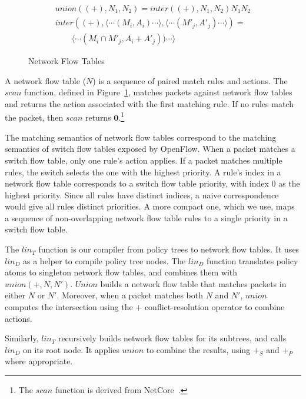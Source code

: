 \begin{figure}[t]
\begin{displaymath}
\begin{array}{l}
\mathit{union}((+),N_1,N_2) = \mathit{inter}((+),N_1,N_2) N_1 N_2 \\
\mathit{inter}((+),\langle\cdots(M_i,A_i)\cdots\rangle, \langle\cdots(M'_j,A'_j)\cdots\rangle) = \\
\qquad \langle\cdots(M_i \cap M'_j,A_i+A'_j))\cdots\rangle
\end{array}
\end{displaymath}

\caption{Network Flow Tables}
\label{f:intermediate}

\end{figure}

A network flow table ($N$) is a sequence of paired match rules
and actions. The $\mathit{scan}$ function, defined in
Figure~\ref{f:intermediate}, matches packets against network flow
tables and returns the action associated with the first matching rule. If
no rules match the packet, then $\mathit{scan}$ returns $\textbf{0}$.\footnote{The
  $\mathit{scan}$ function is derived from 
  NetCore~\cite{Monsanto:2012}.}

The matching semantics of network flow tables correspond to the
matching semantics of switch flow tables exposed by OpenFlow.  When a
packet matches a switch flow table, only one rule's action applies. If a
packet matches multiple rules, the switch selects the one with the
highest priority.  A rule's index in a network flow table corresponds
to a switch flow table priority, with index $0$ as the highest
priority. Since all rules have distinct indices, a naive
correspondence would give all rules distinct priorities. A more
compact one, which we use, maps a sequence of
non-overlapping network flow table rules to a single priority in a
switch flow table.

The $\mathit{lin}_T$ function is our compiler from policy trees to
network flow tables. It uses $\mathit{lin}_D$ as a helper to compile
policy tree nodes.  The $\mathit{lin}_D$ function translates policy
atoms to singleton network flow tables, and combines them with
$\mathit{union(+,N,N')}$.  $\mathit{Union}$ builds a network flow table that
matches packets in either $N$ or $N'$. Moreover, when a packet
matches both $N$ and $N'$, $\mathit{union}$ computes the intersection
using the $+$ conflict-resolution operator to combine
actions.

Similarly, $\mathit{lin}_T$ recursively builds network flow tables for
its subtrees, and calls $\mathit{lin}_D$ on its root node.  It applies
$\mathit{union}$ to combine the results, using $+_S$ and $+_P$ where
appropriate.


